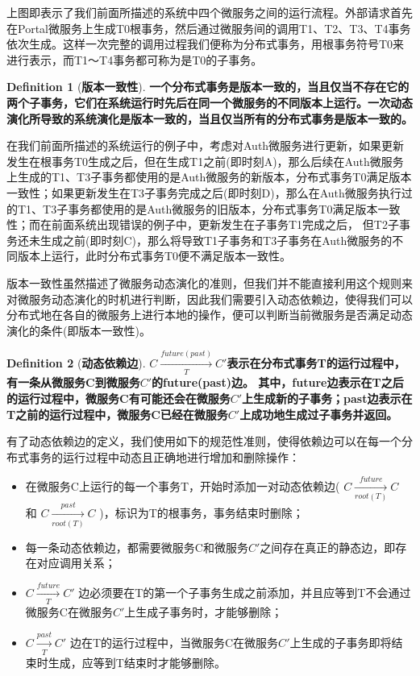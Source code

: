 \documentclass[a4paper, 12pt]{article}
\theoremstyle{definition}
\newtheorem{definition}{Definition}[section]
\begin{document}
上图即表示了我们前面所描述的系统中四个微服务之间的运行流程。外部请求首先在Portal微服务上生成T0根事务，然后通过微服务间的调用T1、T2、T3、T4事务依次生成。这样一次完整的调用过程我们便称为分布式事务，用根事务符号T0来进行表示，而T1～T4事务都可称为是T0的子事务。

\begin{definition}[\textbf{版本一致性}]
\label{definition:version_consistency}
\textbf{一个分布式事务是版本一致的，当且仅当不存在它的两个子事务，它们在系统运行时先后在同一个微服务的不同版本上运行。一次动态演化所导致的系统演化是版本一致的，当且仅当所有的分布式事务是版本一致的。}
\end{definition}



在我们前面所描述的系统运行的例子中，考虑对Auth微服务进行更新，如果更新发生在根事务T0生成之后，但在生成T1之前(即时刻A)，那么后续在Auth微服务上生成的T1、T3子事务都使用的是Auth微服务的新版本，分布式事务T0满足版本一致性；如果更新发生在T3子事务完成之后(即时刻D)，那么在Auth微服务执行过的T1、T3子事务都使用的是Auth微服务的旧版本，分布式事务T0满足版本一致性；而在前面系统出现错误的例子中，更新发生在子事务T1完成之后， 但T2子事务还未生成之前(即时刻C)，那么将导致T1子事务和T3子事务在Auth微服务的不同版本上运行，此时分布式事务T0便不满足版本一致性。

版本一致性虽然描述了微服务动态演化的准则，但我们并不能直接利用这个规则来对微服务动态演化的时机进行判断，因此我们需要引入动态依赖边，使得我们可以分布式地在各自的微服务上进行本地的操作，便可以判断当前微服务是否满足动态演化的条件(即版本一致性)。

\begin{definition}[\textbf{动态依赖边}]
\label{definition:dynamic_dependences}
\textbf{$C \xrightarrow[T]{future(past)}  C'$表示在分布式事务T的运行过程中，有一条从微服务C到微服务$C'$的future(past)边。
其中，future边表示在T之后的运行过程中，微服务C有可能还会在微服务$C'$上生成新的子事务；past边表示在T之前的运行过程中，微服务C已经在微服务$C'$上成功地生成过子事务并返回。}
\end{definition}



有了动态依赖边的定义，我们使用如下的规范性准则，使得依赖边可以在每一个分布式事务的运行过程中动态且正确地进行增加和删除操作：

\begin{itemize}
\item{在微服务C上运行的每一个事务T，开始时添加一对动态依赖边( $C \xrightarrow[root(T)]{future}C$ 和 $C \xrightarrow[root(T)]{past}C$ )，标识为T的根事务，事务结束时删除；}


\item{每一条动态依赖边，都需要微服务C和微服务$C'$之间存在真正的静态边，即存在对应调用关系；}


\item{$C \xrightarrow[T]{future}C'$ 边必须要在T的第一个子事务生成之前添加，并且应等到T不会通过微服务C在微服务$C'$上生成子事务时，才能够删除；}


\item{$C \xrightarrow[T]{past}C'$ 边在T的运行过程中，当微服务C在微服务$C'$上生成的子事务即将结束时生成，应等到T结束时才能够删除。}
\end{itemize}
\end{document}
